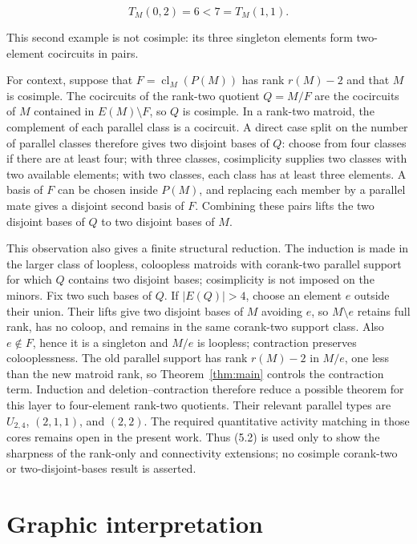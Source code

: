 \documentclass[11pt]{article}
\begin{document}
\[
T_M(0,2)=6<7=T_M(1,1).                         \tag{5.2}
\]

This second example is not cosimple: its three singleton elements form
two-element cocircuits in pairs.

For context, suppose that \(F=\operatorname{cl}_M(P(M))\) has rank
\(r(M)-2\) and that \(M\) is cosimple. The cocircuits of the rank-two quotient
\(Q=M/F\) are the cocircuits of \(M\) contained in \(E(M)\setminus F\), so
\(Q\) is cosimple. In a rank-two matroid, the complement of each parallel
class is a cocircuit. A direct case split on the number of parallel classes
therefore gives two disjoint bases of \(Q\): choose from four classes if there
are at least four; with three classes, cosimplicity supplies two classes with
two available elements; with two classes, each class has at least three
elements. A basis of \(F\) can be chosen inside \(P(M)\), and replacing each
member by a parallel mate gives a disjoint second basis of \(F\). Combining
these pairs lifts the two disjoint bases of \(Q\) to two disjoint bases of
\(M\).

This observation also gives a finite structural reduction. The induction is
made in the larger class of loopless, coloopless matroids with corank-two
parallel support for which \(Q\) contains two disjoint bases; cosimplicity is
not imposed on the minors. Fix two such bases of \(Q\). If \(|E(Q)|>4\), choose
an element \(e\) outside their union. Their lifts give two disjoint bases of
\(M\) avoiding \(e\), so \(M\setminus e\) retains full rank, has no coloop,
and remains in the same corank-two support class. Also \(e\notin F\), hence it
is a singleton and \(M/e\) is loopless; contraction preserves colooplessness.
The old parallel support has rank \(r(M)-2\) in \(M/e\), one less than the new
matroid rank, so Theorem~\ref{thm:main} controls the contraction term. Induction and
deletion--contraction therefore reduce a possible theorem for this layer to
four-element rank-two quotients. Their relevant parallel types are
\(U_{2,4}\), \((2,1,1)\), and \((2,2)\). The required quantitative activity
matching in those cores remains open in the present work. Thus (5.2) is used
only to show the sharpness of the rank-only and connectivity extensions; no
cosimple corank-two or two-disjoint-bases result is asserted.

\section{Graphic interpretation}
\end{document}
